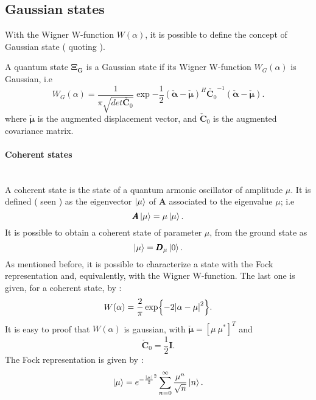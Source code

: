     \subsection{Gaussian states}
    With the Wigner W-function $W(\alpha)$, it is possible to define the concept of Gaussian state
    (\cite{tesiGuerrini} quoting \cite{Gaussian1,Gaussian2,Gaussian3,Gaussian4,Gaussian5}).
    \begin{definition}
        A quantum state $\pmb{\Xi_G}$ is a Gaussian state if its Wigner W-function $W_G(\alpha)$
        is Gaussian, i.e
        \begin{equation}
            W_G(\alpha)=\frac{1}{\pi\sqrt{det\check{\pmb{C}_0}}}\exp{
                -\frac{1}{2}(\check{\pmb{\alpha}}-\check{\pmb{\mu}})^H
                \check{\pmb{C}_0}^{-1}(\check{\pmb{\alpha}}-\check{\pmb{\mu}})}.
        \end{equation}
        where $\check{\pmb{\mu}} $ is the augmented displacement vector, and $\check{\pmb{C}}_0$ 
        is the augmented covariance matrix.
        \label{def:Gaussian}
    \end{definition}

    \paragraph{Coherent states}\mbox{} \\
        A coherent state is the state of a quantum armonic oscillator of amplitude $\mu$.
        It is defined (\cite{tesiGuerrini} seen \cite{CohSt_Glauber,CohSt_Glauber2}) as the eigenvector $\ket{\mu}$ of $\pmb{A}$ 
        associated to the eigenvalue $\mu$; i.e
        \begin{equation}
            \pmb{A}\ket{\mu}=\mu\ket{\mu}.
        \end{equation}
        It is possible to obtain a coherent state of parameter $\mu$, from the ground state as
        \begin{equation}
            \ket{\mu}=\pmb{D}_\mu\ket{0}.
        \end{equation}
        As mentioned before, it is possible to characterize a state with the Fock representation
        and, equivalently, with the Wigner W-function. The last one is given, for a coherent state,
        by \cite{QuantumNoise}:
        \begin{equation}
            W(\alpha)=\frac{2}{\pi}\exp{-2\absolutevalue{\alpha-\mu}^2}.
        \end{equation}
        It is easy to proof that $W(\alpha)$ is gaussian, with $\check{\pmb{\mu}}=[\mu\ \mu^*]^T$ and
        \begin{equation*}
            \check{\pmb{C}}_0=\frac{1}{2}\pmb{I}.
        \end{equation*} 
        The Fock representation is given by \cite{Dowling}:
        \begin{equation}
            \ket{\mu}=e^{-\frac{\absolutevalue{\mu}}{2}^2}\sum_{n=0}^{\infty}
            \frac{\mu^n}{\sqrt{n}}\ket{n}.
        \end{equation}


